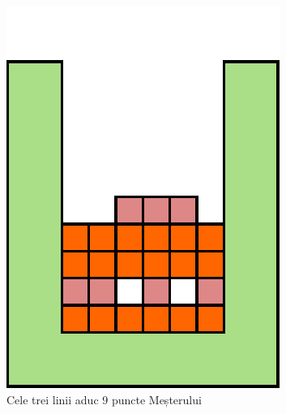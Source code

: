 \documentclass[12pt]{article}
\begin{document}
\begin{figure}[h!]
\begin{subfigure}[t]{0.23\textwidth}
    \includegraphics[width=\textwidth]{graphics/threelinesC.pdf}
    \caption{Cele trei linii aduc 9 puncte Meșterului}
    \label{fig:threelinesC}
  \end{subfigure}%
  ~ %
  \begin{subfigure}[t]{0.23\textwidth}

\end{subfigure}
\end{figure}
\end{document}
